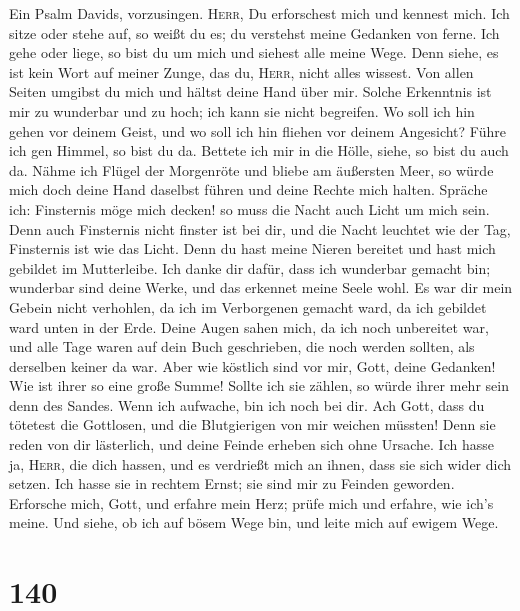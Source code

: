  Ein Psalm Davids, vorzusingen. \textsc{Herr}, Du
erforschest mich und kennest mich.  Ich sitze oder stehe
auf, so weißt du es; du verstehst meine Gedanken von ferne.
 Ich gehe oder liege, so bist du um mich und siehest alle
meine Wege.  Denn siehe, es ist kein Wort auf meiner
Zunge, das du, \textsc{Herr}, nicht alles wissest.  Von
allen Seiten umgibst du mich und hältst deine Hand über mir.
 Solche Erkenntnis ist mir zu wunderbar und zu hoch; ich
kann sie nicht begreifen.  Wo soll ich hin gehen vor
deinem Geist, und wo soll ich hin fliehen vor deinem Angesicht?
 Führe ich gen Himmel, so bist du da. Bettete ich mir in
die Hölle, siehe, so bist du auch da.  Nähme ich Flügel
der Morgenröte und bliebe am äußersten Meer,  so würde
mich doch deine Hand daselbst führen und deine Rechte mich halten.
 Spräche ich: Finsternis möge mich decken! so muss die
Nacht auch Licht um mich sein.  Denn auch Finsternis
nicht finster ist bei dir, und die Nacht leuchtet wie der Tag,
Finsternis ist wie das Licht.  Denn du hast meine Nieren
bereitet und hast mich gebildet im Mutterleibe.  Ich
danke dir dafür, dass ich wunderbar gemacht bin; wunderbar sind deine
Werke, und das erkennet meine Seele wohl.  Es war dir
mein Gebein nicht verhohlen, da ich im Verborgenen gemacht ward, da ich
gebildet ward unten in der Erde.  Deine Augen sahen mich,
da ich noch unbereitet war, und alle Tage waren auf dein Buch
geschrieben, die noch werden sollten, als derselben keiner da war.
 Aber wie köstlich sind vor mir, Gott, deine Gedanken!
Wie ist ihrer so eine große Summe!  Sollte ich sie
zählen, so würde ihrer mehr sein denn des Sandes. Wenn ich aufwache, bin
ich noch bei dir.  Ach Gott, dass du tötetest die
Gottlosen, und die Blutgierigen von mir weichen müssten! 
Denn sie reden von dir lästerlich, und deine Feinde erheben sich ohne
Ursache.  Ich hasse ja, \textsc{Herr}, die dich hassen,
und es verdrießt mich an ihnen, dass sie sich wider dich setzen.
 Ich hasse sie in rechtem Ernst; sie sind mir zu Feinden
geworden.  Erforsche mich, Gott, und erfahre mein Herz;
prüfe mich und erfahre, wie ich's meine.  Und siehe, ob
ich auf bösem Wege bin, und leite mich auf ewigem Wege.

\hypertarget{section-139}{%
\section{140}\label{section-139}}

